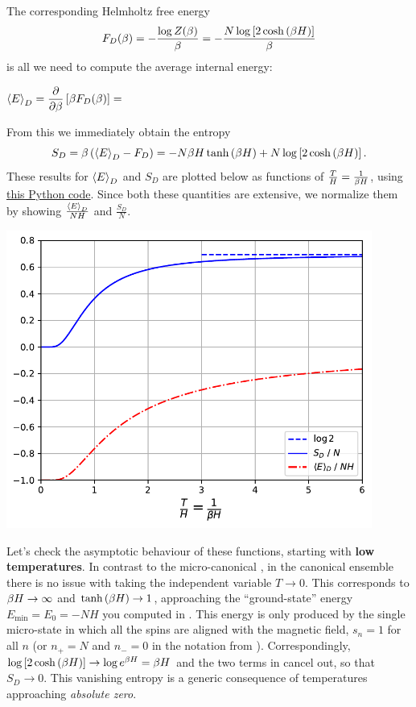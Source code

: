 The corresponding Helmholtz free energy
\begin{equation}
  \label{eq:dist_Helm}
  F_D(\beta) = -\frac{\log Z(\beta)}{\beta} = -\frac{N \log\left[2\cosh\left(\beta H\right)\right]}{\beta}
\end{equation}
is all we need to compute the average internal energy:
\begin{mdframed} %
  $\displaystyle \left\langle E \right\rangle_D = \frac{\partial }{\partial \beta}\left[\beta F_D(\beta)\right] = $ \\[90 pt]
\end{mdframed}
From this we immediately obtain the entropy
\begin{equation}
  \label{eq:dist_entropy}
  S_D = \beta\left(\left\langle E \right\rangle_D - F_D\right) = -N\beta H \tanh\left(\beta H\right) + N \log\left[2\cosh\left(\beta H\right)\right].
\end{equation}
These results for $\left\langle E \right\rangle_D$ and $S_D$ are plotted below as functions of $\frac{T}{H} = \frac{1}{\beta H}$, using \href{https://github.com/daschaich/MATH327_2023/blob/main/lecture_notes/unit03_distinguish.py}{this Python code}.
Since both these quantities are extensive, we normalize them by showing $\frac{\left\langle E \right\rangle_D}{NH}$ and $\frac{S_D}{N}$.

\begin{center}
  \includegraphics[width=0.9\textwidth]{figs/unit03_distinguish.pdf}
\end{center}

Let's check the asymptotic behaviour of these functions, starting with \textbf{low temperatures}.
In contrast to the micro-canonical , in the canonical ensemble there is no issue with taking the independent variable $T \to 0$.
This corresponds to $\beta H \to \infty$ and $\tanh\left(\beta H\right) \to 1$, approaching the ``ground-state'' energy $E_{\text{min}} = E_0 = -NH$ you computed in .
This energy is only produced by the single micro-state in which all the spins are aligned with the magnetic field, $s_n = 1$ for all $n$ (or $n_+ = N$ and $n_- = 0$ in the notation from ).
Correspondingly, $\log\left[2\cosh\left(\beta H\right)\right] \to \log e^{\beta H} = \beta H$ and the two terms in  cancel out, so that $S_D \to 0$.
This vanishing entropy is a generic consequence of temperatures approaching \textit{absolute zero}.

